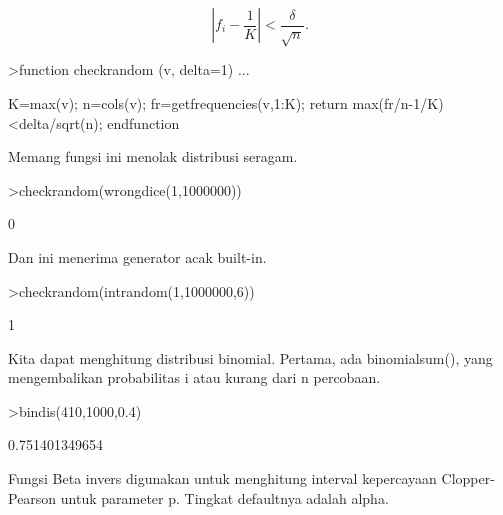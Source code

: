 \documentclass[a4paper,10pt]{article}
\begin{document}
\begin{eulernotebook}
\begin{eulercomment}
\begin{eulercomment}
\begin{eulercomment}
\begin{eulercomment}
\begin{eulercomment}
\end{eulercomment}
\begin{eulerformula}
\[
\left|f_i-\frac{1}{K}\right| < \frac{\delta}{\sqrt{n}}.
\]
\end{eulerformula}
\begin{eulerprompt}
>function checkrandom (v, delta=1) ...
\end{eulerprompt}
\begin{eulerudf}
    K=max(v); n=cols(v);
    fr=getfrequencies(v,1:K);
    return max(fr/n-1/K)<delta/sqrt(n);
    endfunction
\end{eulerudf}
\begin{eulercomment}
Memang fungsi ini menolak distribusi seragam.
\end{eulercomment}
\begin{eulerprompt}
>checkrandom(wrongdice(1,1000000))
\end{eulerprompt}
\begin{euleroutput}
  0
\end{euleroutput}
\begin{eulercomment}
Dan ini menerima generator acak built-in.
\end{eulercomment}
\begin{eulerprompt}
>checkrandom(intrandom(1,1000000,6))
\end{eulerprompt}
\begin{euleroutput}
  1
\end{euleroutput}
\begin{eulercomment}
Kita dapat menghitung distribusi binomial. Pertama, ada binomialsum(),
yang mengembalikan probabilitas i atau kurang dari n percobaan.
\end{eulercomment}
\begin{eulerprompt}
>bindis(410,1000,0.4)
\end{eulerprompt}
\begin{euleroutput}
  0.751401349654
\end{euleroutput}
\begin{eulercomment}
Fungsi Beta invers digunakan untuk menghitung interval kepercayaan
Clopper-Pearson untuk parameter p. Tingkat defaultnya adalah alpha.


\end{eulercomment}
\end{eulercomment}
\end{eulercomment}
\end{eulercomment}
\end{eulercomment}
\end{eulernotebook}
\end{document}
